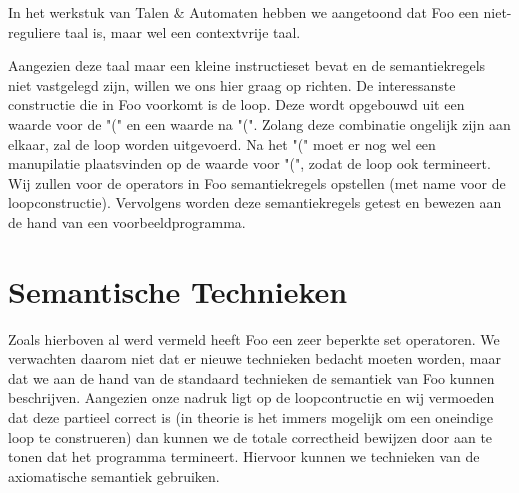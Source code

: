 \documentclass[11pt]{article}
\begin{document}
In het werkstuk van Talen \& Automaten hebben we aangetoond dat Foo een niet-reguliere taal is, maar wel een contextvrije taal.

Aangezien deze taal maar een kleine instructieset bevat en de semantiekregels niet vastgelegd zijn, willen we ons hier graag op richten.
De interessanste constructie die in Foo voorkomt is de loop.
Deze wordt opgebouwd uit een waarde voor de "(" en een waarde na "(".
Zolang deze combinatie ongelijk zijn aan elkaar, zal de loop worden uitgevoerd. Na het "(" moet er nog wel een manupilatie plaatsvinden op de waarde voor "(", zodat de loop ook termineert.
Wij zullen voor de operators in Foo semantiekregels opstellen (met name voor de loopconstructie). Vervolgens worden deze semantiekregels getest en bewezen aan de hand van een voorbeeldprogramma.




\section{Semantische Technieken}

Zoals hierboven al werd vermeld heeft Foo een zeer beperkte set operatoren.
We verwachten daarom niet dat er nieuwe technieken bedacht moeten worden, maar dat we aan de hand van de standaard technieken de semantiek van Foo kunnen beschrijven.
Aangezien onze nadruk ligt op de loopcontructie en wij vermoeden dat deze partieel correct is (in theorie is het immers mogelijk om een oneindige loop te construeren) dan kunnen we de totale correctheid bewijzen door aan te tonen dat het programma termineert. 
Hiervoor kunnen we technieken van de axiomatische semantiek gebruiken.

\end{document}
